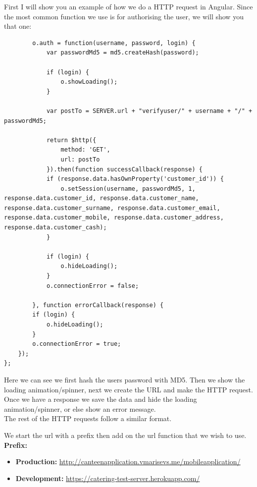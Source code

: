 First I will show you an example of how we do a HTTP request in Angular. Since the most common function we use is for authorising the user, we will show you that one:
\begin{verbatim}
        o.auth = function(username, password, login) {
            var passwordMd5 = md5.createHash(password);
            
            if (login) {
                o.showLoading();
            }
            
            var postTo = SERVER.url + "verifyuser/" + username + "/" + passwordMd5;
            
            return $http({
                method: 'GET',
                url: postTo
            }).then(function successCallback(response) {
            if (response.data.hasOwnProperty('customer_id')) {
                o.setSession(username, passwordMd5, 1, response.data.customer_id, response.data.customer_name, response.data.customer_surname, response.data.customer_email, response.data.customer_mobile, response.data.customer_address, response.data.customer_cash);
            }
            
            if (login) {
                o.hideLoading();
            }
            o.connectionError = false;
            
        }, function errorCallback(response) {
        if (login) {
            o.hideLoading();
        }
        o.connectionError = true;
    });
};
\end{verbatim}
Here we can see we first hash the users password with MD5.
Then we show the loading animation/spinner, next we create the URL and make the HTTP request.
Once we have a response we save the data and hide the loading animation/spinner, or else show an error message.
\\

The rest of the HTTP requests follow a similar format.
\linebreak

\noindent We start the url with a prefix then add on the url function that we wish to use. \\

\textbf{Prefix:}
\begin{itemize}[noitemsep,nolistsep]
\item \textbf{Production:} \url{http://canteenapplication.vmarisevs.me/mobileapplication/}
\item \textbf{Development:} \url{https://catering-test-server.herokuapp.com/}
\end{itemize}

